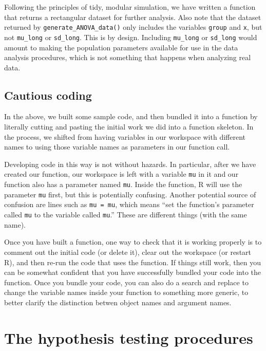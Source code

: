 \documentclass[
]{book}
\begin{document}
Following the principles of tidy, modular simulation, we have written a function that returns a rectangular dataset for further analysis.
Also note that the dataset returned by \texttt{generate\_ANOVA\_data()} only includes the variables \texttt{group} and \texttt{x}, but not \texttt{mu\_long} or \texttt{sd\_long}.
This is by design.
Including \texttt{mu\_long} or \texttt{sd\_long} would amount to making the population parameters available for use in the data analysis procedures, which is not something that happens when analyzing real data.

\subsection{Cautious coding}\label{cautious-coding}

In the above, we built some sample code, and then bundled it into a function by literally cutting and pasting the initial work we did into a function skeleton.
In the process, we shifted from having variables in our workspace with different names to using those variable names as parameters in our function call.

Developing code in this way is not without hazards.
In particular, after we have created our function, our workspace is left with a variable \texttt{mu} in it and our function also has a parameter named \texttt{mu}.
Inside the function, R will use the parameter \texttt{mu} first, but this is potentially confusing.
Another potential source of confusion are lines such as \texttt{mu\ =\ mu}, which means ``set the function's parameter called \texttt{mu} to the variable called \texttt{mu}.''
These are different things (with the same name).

Once you have built a function, one way to check that it is working properly is to comment out the initial code (or delete it), clear out the workspace (or restart R), and then re-run the code that uses the function.
If things still work, then you can be somewhat confident that you have successfully bundled your code into the function.
Once you bundle your code, you can also do a search and replace to change the variable names inside your function to something more generic, to better clarify the distinction betwen object names and argument names.

\section{The hypothesis testing procedures}\label{the-hypothesis-testing-procedures}
\end{document}
